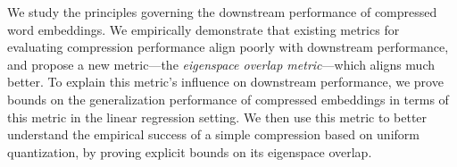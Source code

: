 We study the principles governing the downstream performance of compressed word embeddings.
We empirically demonstrate that existing metrics for evaluating compression performance align poorly with downstream performance, and propose a new metric---the \textit{eigenspace overlap metric}---which aligns much better.
To explain this metric's influence on downstream performance, we prove bounds on the generalization performance of compressed embeddings in terms of this metric in the linear regression setting.
We then use this metric to better understand the empirical success of a simple compression based on uniform quantization, by proving explicit bounds on its eigenspace overlap.



%
%
%
%
%
%
%

